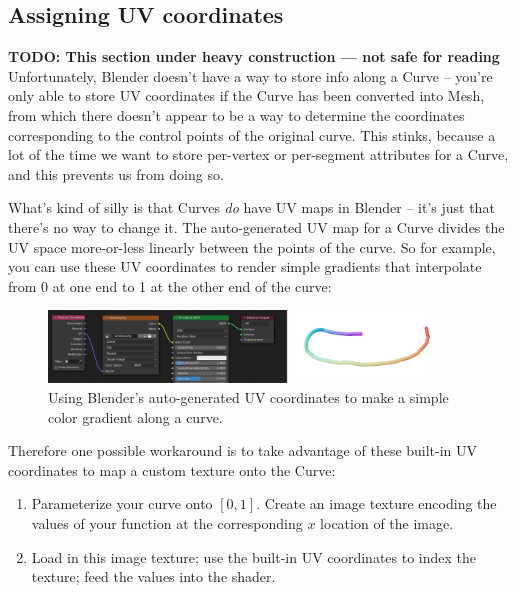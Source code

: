 \documentclass[10pt]{article}
\begin{document}
\subsection{Assigning UV coordinates}
{\bf TODO: This section under heavy construction --- not safe for reading}
Unfortunately, Blender doesn't have a way to store info along a Curve -- you're only able to store UV coordinates if the Curve has been converted into Mesh, from which there doesn't appear to be a way to determine the coordinates corresponding to the control points of the original curve. This stinks, because a lot of the time we want to store per-vertex or per-segment attributes for a Curve, and this prevents us from doing so.

What's kind of silly is that Curves \emph{do} have UV maps in Blender -- it's just that there's no way to change it. The auto-generated UV map for a Curve divides the UV space more-or-less linearly between the points of the curve. So for example, you can use these UV coordinates to render simple gradients that interpolate from 0 at one end to 1 at the other end of the curve:
\begin{figure}[H]
    \centering
    \includegraphics[width=0.9\textwidth]{images/curve_auto_uv.png}
    \caption{Using Blender's auto-generated UV coordinates to make a simple color gradient along a curve.}
    \label{fig:curve_auto_uv}
\end{figure}

Therefore one possible workaround is to take advantage of these built-in UV coordinates to map a custom texture onto the Curve:
\begin{enumerate}
    \item Parameterize your curve onto $[0,1]$. Create an image texture encoding the values of your function at the corresponding $x$ location of the image.
    \item Load in this image texture; use the built-in UV coordinates to index the texture; feed the values into the shader.
\end{enumerate}
\end{document}

